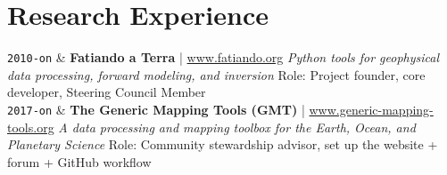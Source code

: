 \documentclass[9pt,a4paper]{article}
\newcommand{\LastName}{Xia}
\newcommand{\Initials}{S}
\newcommand{\Me}{\underline{\Initials. \LastName}}  %
\newcommand{\Duration}[2]{\fontsize{10pt}{0}\selectfont \texttt{#1-#2}}
\newcommand{\Year}[1]{\fontsize{10pt}{0}\selectfont \texttt{#1}}
\newcommand{\Ongoing}{on}
\newcommand{\Website}[1]{\href{https://#1}{#1}}
\newcommand{\GitHub}[1]{\faGithub{} \href{https://github.com/#1}{#1}}
\begin{document}
\section{Research Experience}

\begin{EntriesTableDuration}
  \Duration{2010}{\Ongoing} &
  \textbf{Fatiando a Terra} | \Website{www.fatiando.org}
  \newline
  \textit{Python tools for geophysical data processing, forward modeling, and inversion}
  \newline
  Role: Project founder, core developer, Steering Council Member
  \\
  \Duration{2017}{\Ongoing} &
  \textbf{The Generic Mapping Tools (GMT)} | \Website{www.generic-mapping-tools.org}
  \newline
  \textit{A data processing and mapping toolbox for the Earth, Ocean, and Planetary Science}
  \newline
  Role: Community stewardship advisor, set up the website + forum + GitHub workflow
  \\

  
\end{EntriesTableDuration}

\iffalse
\section{Selected Invited Presentations}

\begin{EntriesTableYear}
\Year{2021}  &
  \textbf{Design useful tools that do one thing well and work together: rediscovering the UNIX philosophy while building the Fatiando a Terra project}.
  \newline
  AGU 2021.
  \Me; \LLi; \Santiago; \Agustina.
  \GitHub{fatiando/agu2021}.
  \\
  &
  \textbf{Open-science for gravimetry: tools, challenges, and opportunities}.
  \newline
  GFZ Helmholtz Centre Potsdam.
  \Me; \Santiago; \Agustina.
  \GitHub{leouieda/2021-06-22-gfz}.
  \\
  &
  \textbf{Fatiando a Terra: Open-source tools for geophysics}.
  \newline
  Geophysical Society of Houston.
  \Me; \Santiago; \Agustina.
  \GitHub{fatiando/2021-gsh}.
  \\
\Year{2020}  &
  \textbf{Geophysical research powered by open-source}.
  \newline
  Christian Albrechts Universität zu Kiel.
  \Me.
  \GitHub{leouieda/2020-07-01-kiel}.
\end{EntriesTableYear}
\fi
\end{document}
